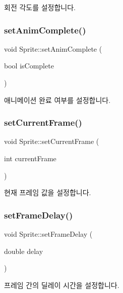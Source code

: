 회전 각도를 설정합니다. \mbox{\label{class_sprite_a38f9be6d0bec1e1debf6221f97119b31}} 
\subsubsection{\texorpdfstring{setAnimComplete()}{setAnimComplete()}}
{\footnotesize\ttfamily void Sprite\+::set\+Anim\+Complete (\begin{DoxyParamCaption}\item[{bool}]{is\+Complete }\end{DoxyParamCaption})}

애니메이션 완료 여부를 설정합니다. \mbox{\label{class_sprite_ad3ab1bb056b66dfb446f33770d3a7701}} 
\subsubsection{\texorpdfstring{setCurrentFrame()}{setCurrentFrame()}}
{\footnotesize\ttfamily void Sprite\+::set\+Current\+Frame (\begin{DoxyParamCaption}\item[{int}]{current\+Frame }\end{DoxyParamCaption})}

현재 프레임 값을 설정합니다. \mbox{\label{class_sprite_a22a26f0936c2d9926e4753aaa984d70f}} 
\subsubsection{\texorpdfstring{setFrameDelay()}{setFrameDelay()}}
{\footnotesize\ttfamily void Sprite\+::set\+Frame\+Delay (\begin{DoxyParamCaption}\item[{double}]{delay }\end{DoxyParamCaption})}

프레임 간의 딜레이 시간을 설정합니다. \mbox{\label{class_sprite_a577b8a8597a7e622cb4bc91fb201f650}} 
